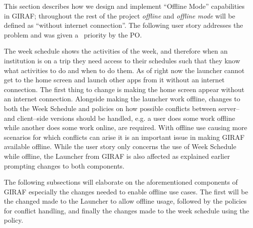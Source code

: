 This section describes how we design and implement \enquote{Offline Mode} capabilities in GIRAF; throughout the rest of the project \textit{offline} and \textit{offline mode} will be defined as \enquote{without internet connection}.
The following user story addresses the problem and was given a \phigh~priority by the PO.

\begin{center}
\end{center}
The week schedule shows the activities of the week, and therefore when an institution is on a trip they need access to their schedules such that they know what activities to do and when to do them.
As of right now the launcher cannot get to the home screen and launch other apps from it without an internet connection.
The first thing to change is making the home screen appear without an internet connection.
Alongside making the launcher work offline, changes to both the Week Schedule and policies on how possible conflicts between server-- and client--side versions should be handled, e.g. a user does some work offline while another does some work online, are required.
With offline use causing more scenarios for which conflicts can arise it is an important issue in making GIRAF available offline.
While the user story only concerns the use of Week Schedule while offline, the Launcher from GIRAF is also affected as explained earlier prompting changes to both components.

The following subsections will elaborate on the aforementioned components of GIRAF especially the changes needed to enable offline use cases.
The first will be the changed made to the Launcher to allow offline usage, followed by the policies for conflict handling, and finally the changes made to the week schedule using the policy.